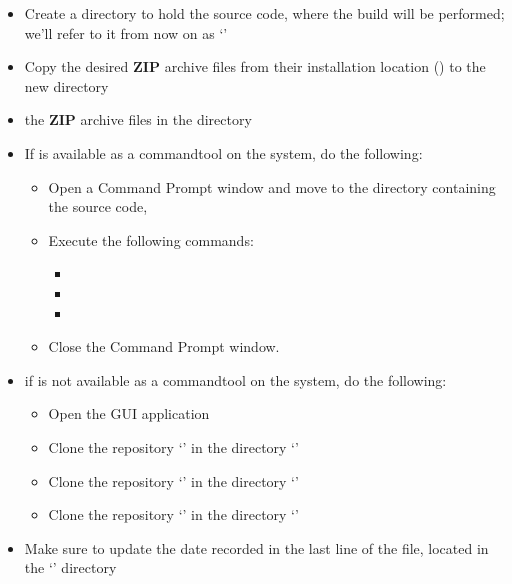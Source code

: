 \secondaryEnd
\tertiaryEnd
{}
\begin{itemize}
\item Create a directory to hold the source code, where the build will be performed; we'll
refer to it from now on as `'
\item\exSp{}Copy the desired \textbf{ZIP} archive files from their installation location
() to the
new directory 
\item\exSp{} the \textbf{ZIP} archive files in the directory
\item\exSp{}If  is available as a command\longDash{}tool on the system, do the
following:
\begin{itemize}
\item Open a Command Prompt window and move to the directory containing the
\mplusm{} source code, 
\item\exSp{}Execute the following commands:
\begin{itemize}
\item {}
\item\exSp{}
\item\exSp{}
\end{itemize}
\item\exSp{}Close the Command Prompt window.
\end{itemize}
\item\exSp{}if  is not available as a command\longDash{}tool on the system, do
the following:
\begin{itemize}
\item Open the  GUI application
\item\exSp{}Clone the repository
`' in the directory
`'
\item\exSp{}Clone the repository
`' in the
directory `'
\item\exSp{}Clone the repository
`' in the directory
`'
\end{itemize}
\item\exSp{}Make sure to update the date recorded in the last line of the
 file, located in the `' directory
\end{itemize}
